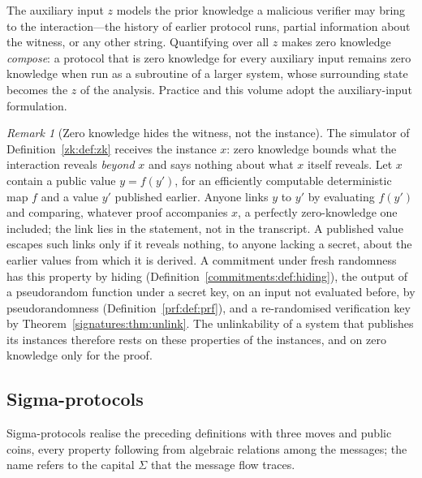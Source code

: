 \documentclass[11pt,a4paper]{article}
\theoremstyle{definition}
\theoremstyle{remark}
\newtheorem{remark}[theorem]{Remark}
\begin{document}
The auxiliary input \(z\) models the prior knowledge a malicious
verifier may bring to the interaction---the history of earlier
protocol runs, partial information about the witness, or any other
string. Quantifying over all \(z\) makes zero knowledge
\emph{compose}: a protocol that is zero knowledge for every
auxiliary input remains zero knowledge when run as a subroutine of a
larger system, whose surrounding state becomes the \(z\) of the
analysis. Practice and this volume adopt the auxiliary-input
formulation.

\begin{remark}[Zero knowledge hides the witness, not the instance]
\label{rem:zk-instance}
The simulator of Definition~\ref{zk:def:zk} receives the instance \(x\):
zero knowledge bounds what the interaction reveals \emph{beyond} \(x\)
and says nothing about what \(x\) itself reveals. Let \(x\) contain a
public value \(y = f(y')\), for an efficiently computable deterministic
map \(f\) and a value \(y'\) published earlier. Anyone links \(y\) to
\(y'\) by evaluating \(f(y')\) and comparing, whatever proof accompanies
\(x\), a perfectly zero-knowledge one included; the link lies in the
statement, not in the transcript. A published value escapes such links
only if it reveals nothing, to anyone lacking a secret, about the earlier
values from which it is derived. A commitment under fresh randomness has
this property by hiding (Definition~\ref{commitments:def:hiding}), the
output of a pseudorandom function under a secret key, on an input not
evaluated before, by pseudorandomness (Definition~\ref{prf:def:prf}), and
a re-randomised verification key by Theorem~\ref{signatures:thm:unlink}.
The unlinkability of a system that
publishes its instances therefore rests on these properties of the
instances, and on zero knowledge only for the proof.
\end{remark}

\subsection{Sigma-protocols}\label{zk:subsec:sigma}

Sigma-protocols realise the preceding definitions with three moves and
public coins, every property following from algebraic relations among
the messages; the name refers to the capital \(\Sigma\) that the
message flow traces.
\end{document}

